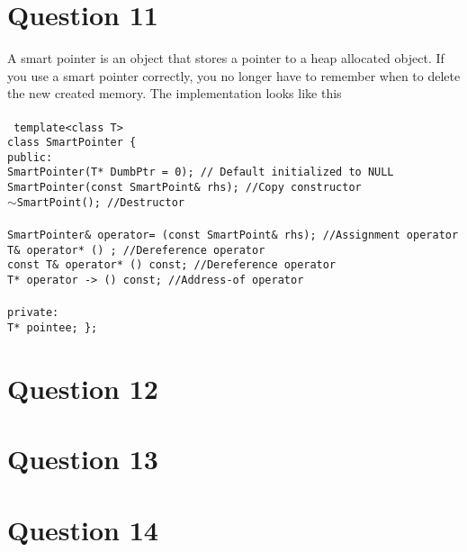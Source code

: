 \documentclass[12pt]{article}
\begin{document}
\section*{Question 11}
\begin{solution}
A smart pointer is an object that stores a pointer to a heap allocated object. If you use a smart pointer correctly, you no longer have to remember when to delete the new created memory. The implementation looks like this\\
\\
\texttt{
template<class T>\\
class SmartPointer \{ \\
public:\\
  SmartPointer(T* DumbPtr = 0); // Default initialized to NULL\\
  SmartPointer(const SmartPoint\& rhs); //Copy constructor\\
  $\sim$SmartPoint(); //Destructor\\  
  \\
  SmartPointer\& operator= (const SmartPoint\& rhs); //Assignment operator\\
  T\& operator* () ; //Dereference operator\\
  const T\& operator* () const; //Dereference operator\\
  T* operator -> () const; //Address-of operator\\
  \\
private:\\
  T* pointee; 
\};
}
\end{solution}

\section*{Question 12}
\begin{solution}
\end{solution}

\section*{Question 13}
\begin{solution}
\end{solution}

\section*{Question 14}
\begin{solution}
\end{solution}
\end{document}
